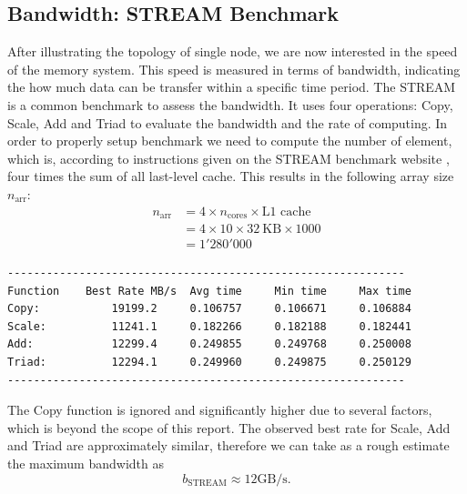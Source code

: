 \subsection{Bandwidth: STREAM Benchmark}
After illustrating the topology of single node, we are now interested in the speed of the memory system. This speed is measured in terms of bandwidth, indicating the how much data can be transfer within a specific time period. The STREAM is a common benchmark to assess the bandwidth. It uses four operations: Copy, Scale, Add and Triad to evaluate the bandwidth and the rate of computing. In order to properly setup benchmark we need to compute the number of element, which is, according to instructions given on the STREAM benchmark website \cite{noauthor_memory_nodate}, four times the sum of all last-level cache. This results in the following array size $n_{\text{arr}}$:
\begin{equation}
	\begin{aligned}
		n_{\text{arr}} & = 4 \times n_{\text{cores}} \times \text{L1 cache} \\
		               & = 4 \times 10 \times 32 \ \text{KB} \times 1000    \\
		               & = 1'280'000
	\end{aligned}
\end{equation}
\begin{lstlisting}[language=bash, caption=Output of STREAM benchmark]
-------------------------------------------------------------
Function    Best Rate MB/s  Avg time     Min time     Max time
Copy:           19199.2     0.106757     0.106671     0.106884
Scale:          11241.1     0.182266     0.182188     0.182441
Add:            12299.4     0.249855     0.249768     0.250008
Triad:          12294.1     0.249960     0.249875     0.250129
-------------------------------------------------------------
\end{lstlisting}
The Copy function is ignored and significantly higher due to several factors, which is beyond the scope of this report.
The observed best rate for Scale, Add and Triad are approximately similar, therefore we can take as a rough estimate the maximum bandwidth as
\begin{equation} \label{eq:stream}
	b_{\text{STREAM}} \approx 12 \text{GB/s}.
\end{equation}

